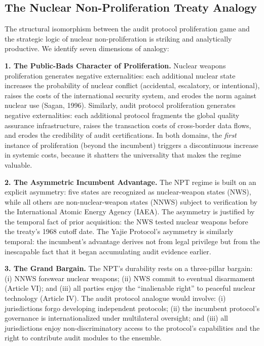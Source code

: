 \documentclass[12pt,a4paper]{article}
\theoremstyle{definition}
\theoremstyle{remark}
\begin{document}
\subsection{The Nuclear Non-Proliferation Treaty Analogy}

The structural isomorphism between the audit protocol proliferation game and the strategic logic of nuclear non-proliferation is striking and analytically productive. We identify seven dimensions of analogy:

\textbf{1. The Public-Bads Character of Proliferation.} Nuclear weapons proliferation generates negative externalities: each additional nuclear state increases the probability of nuclear conflict (accidental, escalatory, or intentional), raises the costs of the international security system, and erodes the norm against nuclear use (Sagan, 1996). Similarly, audit protocol proliferation generates negative externalities: each additional protocol fragments the global quality assurance infrastructure, raises the transaction costs of cross-border data flows, and erodes the credibility of audit certifications. In both domains, the \textit{first} instance of proliferation (beyond the incumbent) triggers a discontinuous increase in systemic costs, because it shatters the universality that makes the regime valuable.

\textbf{2. The Asymmetric Incumbent Advantage.} The NPT regime is built on an explicit asymmetry: five states are recognized as nuclear-weapon states (NWS), while all others are non-nuclear-weapon states (NNWS) subject to verification by the International Atomic Energy Agency (IAEA). The asymmetry is justified by the temporal fact of prior acquisition: the NWS tested nuclear weapons before the treaty's 1968 cutoff date. The Yajie Protocol's asymmetry is similarly temporal: the incumbent's advantage derives not from legal privilege but from the inescapable fact that it began accumulating audit evidence earlier.

\textbf{3. The Grand Bargain.} The NPT's durability rests on a three-pillar bargain: (i) NNWS forswear nuclear weapons; (ii) NWS commit to eventual disarmament (Article VI); and (iii) all parties enjoy the ``inalienable right'' to peaceful nuclear technology (Article IV). The audit protocol analogue would involve: (i) jurisdictions forgo developing independent protocols; (ii) the incumbent protocol's governance is internationalized under multilateral oversight; and (iii) all jurisdictions enjoy non-discriminatory access to the protocol's capabilities and the right to contribute audit modules to the ensemble.
\end{document}
